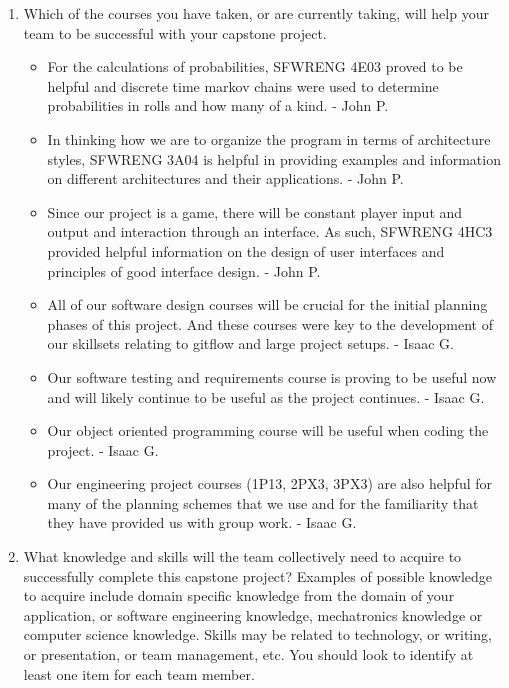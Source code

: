 \begin{enumerate}
  \item Which of the courses you have taken, or are currently taking, will help
  your team to be successful with your capstone project.
  
	\begin{itemize}
		\item For the calculations of probabilities, SFWRENG 4E03 proved to be helpful and discrete time markov chains were used to determine probabilities in rolls and how many of a kind. - John P.
		\item In thinking how we are to organize the program in terms of architecture styles, SFWRENG 3A04 is helpful in providing examples and information on different architectures and their applications. - John P.
		\item Since our project is a game, there will be constant player input and output and interaction through an interface. As such, SFWRENG 4HC3 provided helpful information on the design of user interfaces and principles of good interface design. - John P.
		\item All of our software design courses will be crucial for the initial planning phases of this project. And these courses were key to the development of our skillsets relating to gitflow and large project setups. - Isaac G.
    \item Our software testing and requirements course is proving to be useful now and will likely continue to be useful as the project continues. - Isaac G.
    \item Our object oriented programming course will be useful when coding the project. - Isaac G.
    \item Our engineering project courses (1P13, 2PX3, 3PX3) are also helpful for many of the planning schemes that we use and for the familiarity that they have provided us with group work. - Isaac G.
	\end{itemize}    
  
  \item What knowledge and skills will the team collectively need to acquire to
  successfully complete this capstone project?  Examples of possible knowledge
  to acquire include domain specific knowledge from the domain of your
  application, or software engineering knowledge, mechatronics knowledge or
  computer science knowledge.  Skills may be related to technology, or writing,
  or presentation, or team management, etc.  You should look to identify at
  least one item for each team member.
  

\end{enumerate}
